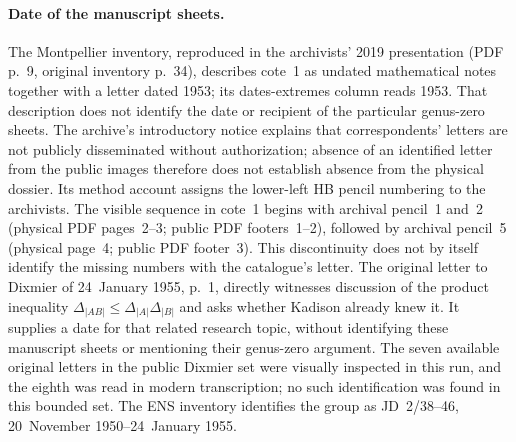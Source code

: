 \paragraph{Date of the manuscript sheets.}
The Montpellier inventory, reproduced in the archivists' 2019 presentation
(PDF p.~9, original inventory p.~34), describes cote~1 as undated mathematical
notes together with a letter dated 1953; its dates-extremes column reads
1953.  That description does not identify the date or recipient of the
particular genus-zero sheets.\cite{algMontpellierInventoryPresentation2019}
The archive's introductory notice explains that correspondents' letters
are not publicly disseminated without authorization; absence of an
identified letter from the public images therefore does not establish
absence from the physical dossier.  Its method account assigns the
lower-left HB pencil numbering to the archivists.  The visible sequence
in cote~1 begins with archival pencil~1 and~2 (physical PDF pages~2--3;
public PDF footers~1--2), followed by archival pencil~5 (physical page~4;
public PDF footer~3).  This discontinuity does not by itself
identify the missing numbers with the catalogue's letter.\cite{algMontpellierArchiveMethod}
The original letter to Dixmier of 24~January 1955, p.~1, directly witnesses
discussion of the product inequality
$\Delta_{|AB|}\leq\Delta_{|A|}\Delta_{|B|}$ and asks whether Kadison already
knew it.  It supplies a date for that related research topic, without
identifying these manuscript sheets or mentioning their genus-zero
argument.\cite{algDixmier19550124}
The seven available original letters in the public Dixmier set were
visually inspected in this run, and the eighth was read in modern
transcription; no such identification was found in this bounded set.
The ENS inventory identifies the group as JD~2/38--46,
20~November 1950--24~January 1955.\cite{algDixmierInventory2019}
